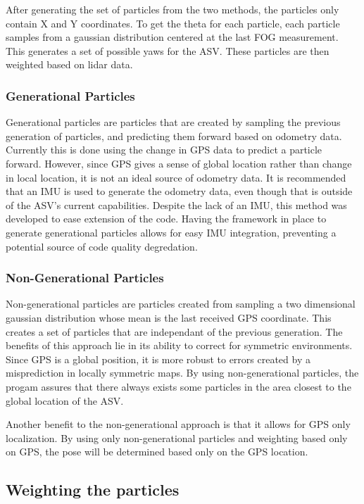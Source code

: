 \documentclass[10pt]{IEEEtran}
\begin{document}
After generating the set of particles from the two methods, the particles only contain X and
Y coordinates.  To get the theta for each particle, each particle samples from a gaussian
distribution centered at the last FOG measurement.  This generates a set of possible yaws
for the ASV.  These particles are then weighted based on lidar data.

\subsubsection{Generational Particles}
Generational particles are particles that are created by sampling the previous generation of
particles, and predicting them forward based on odometry data. Currently this is done using
the change in GPS data to predict a particle forward.  However, since GPS gives a sense of 
global location rather than change in local location, it is not an ideal source of odometry
data.  It is recommended that an IMU is used to generate the odometry data, even though that
is outside of the ASV's current capabilities.  Despite the lack of an IMU, this method was
developed to ease extension of the code.  Having the framework in place to generate 
generational particles allows for easy IMU integration, preventing a potential source of 
code quality degredation.

\subsubsection{Non-Generational Particles}
Non-generational particles are particles created from sampling a two dimensional gaussian
distribution whose mean is the last received GPS coordinate.  This creates a set of particles
that are independant of the previous generation.  The benefits of this approach lie in its 
ability to correct for symmetric environments.  Since GPS is a global position, it is 
more robust to errors created by a misprediction in locally symmetric maps.  
By using non-generational particles, the progam assures that there always exists some 
particles in the area closest to the global location of the ASV. %

Another benefit to the non-generational approach is that it allows for GPS only localization.
By using only non-generational particles and weighting based only on GPS, the pose will 
be determined based only on the GPS location.

\subsection{Weighting the particles}
\end{document}
